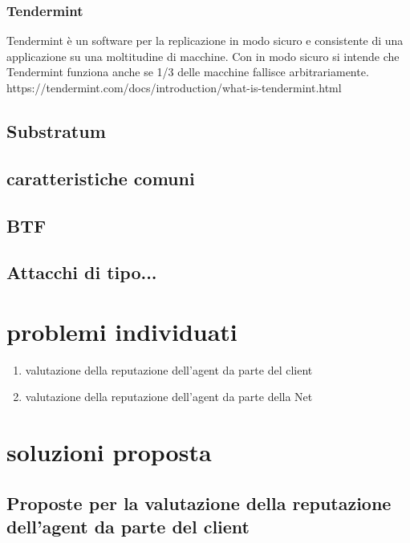 \documentclass[]{article}
\begin{document}
	\subsubsection{Tendermint}
	Tendermint è un software per la replicazione in modo sicuro e consistente di una applicazione su una moltitudine di macchine. Con in modo sicuro si intende che Tendermint funziona anche se 1/3 delle macchine fallisce arbitrariamente.
	https://tendermint.com/docs/introduction/what-is-tendermint.html
	
	\subsection{Substratum}
	\subsection{caratteristiche comuni}
	\subsection{BTF}
	\subsection{Attacchi di tipo...}
		
	\section{problemi individuati}
	\begin{enumerate}
		\item valutazione della reputazione dell'agent da parte del client
		\item valutazione della reputazione dell'agent da parte della Net
	\end{enumerate}
	
	\section{soluzioni proposta}
	\subsection{Proposte per la valutazione della reputazione dell'agent da parte del client}
	
\end{document}

